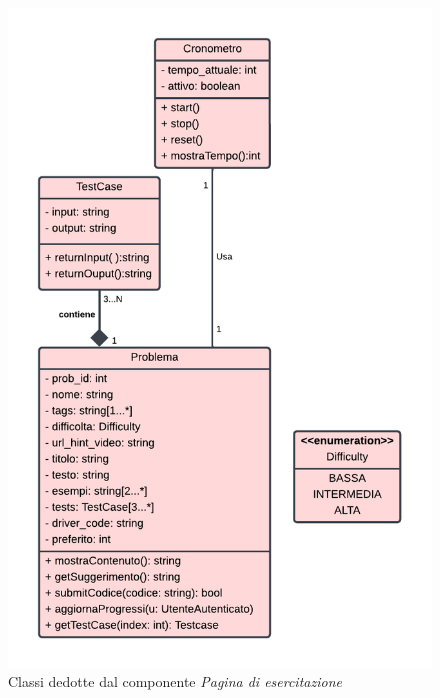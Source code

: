 \documentclass[11pt, a4paper]{article}
\theoremstyle{definition} %
\begin{document}
\begin{figure}[H]
\centering
\includegraphics[scale = 0.85]{materiale/class-esercitazione.pdf}
\caption{Classi dedotte dal componente \textit{Pagina di esercitazione}}
\label{esercitaz}
\end{figure}
\end{document}
